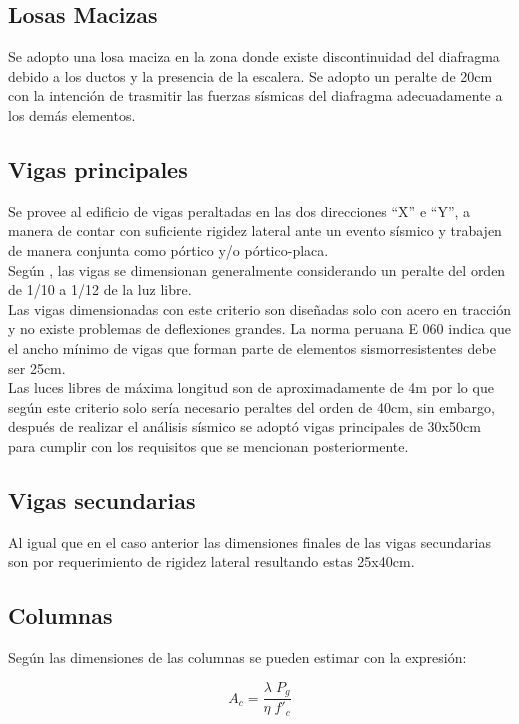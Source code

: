 \subsection{Losas Macizas}
Se adopto una losa maciza en la zona donde existe discontinuidad del diafragma debido a los ductos y la presencia de la escalera. Se adopto un peralte de 20cm con la intención de trasmitir las fuerzas sísmicas del diafragma adecuadamente a los demás elementos.

\subsection{Vigas principales}
Se provee al edificio de vigas peraltadas en las dos direcciones ``X'' e ``Y'', a manera de contar con suficiente rigidez lateral ante un evento sísmico y trabajen de manera conjunta como pórtico y/o pórtico-placa.
\\
Según \cite{blanco}, las vigas se dimensionan generalmente considerando un peralte del orden de 1/10 a 1/12 de la luz libre.
\\
Las vigas dimensionadas con este criterio son diseñadas solo con acero en tracción y no existe problemas de deflexiones grandes.
La norma peruana E 060 indica que el ancho mínimo de vigas que forman parte de elementos sismorresistentes debe ser 25cm.
\\
Las luces libres de máxima longitud son de aproximadamente de 4m por lo que según este criterio solo sería necesario peraltes del orden de 40cm, sin embargo, después de realizar el análisis sísmico se adoptó vigas principales de 30x50cm para cumplir con los requisitos que se mencionan posteriormente.

\subsection{Vigas secundarias}
Al igual que en el caso anterior las dimensiones finales de las vigas secundarias son por requerimiento de rigidez lateral resultando estas 25x40cm.

\subsection{Columnas}

Según \cite{ovi2016} las dimensiones de las columnas se pueden estimar con la expresión:

\begin{equation}
A_{c}=\frac{\lambda\;P_{g} }{\eta \;f'_{c}}
\end{equation}

